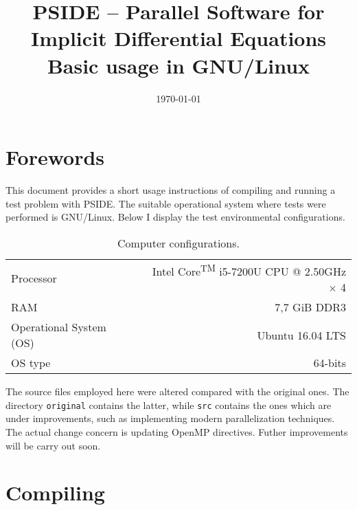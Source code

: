 \documentclass[a4paper,11pt]{article}
\title{{\LARGE \textbf{PSIDE -- Parallel Software for Implicit Differential Equations}}\\ 
{Basic usage in GNU/Linux}
 }%
\date{\today}
\theoremstyle{comm}
\begin{document}
\maketitle


\section{Forewords}

This document provides a short usage instructions of compiling and running a test problem with PSIDE. The suitable operational system where tests were performed is GNU/Linux. Below I display the test environmental configurations.

\begin{table}[h]
\centering
{\fontsize{10}{12}\selectfont
\begin{tabular}{l | r} \toprule \toprule
Processor 	&  Intel\textsuperscript{\tiny{\textregistered}} Core\textsuperscript{\tiny{TM}} i5-7200U CPU @ 2.50GHz $\times$ 4  \\[0.3em] 
RAM &  7,7 GiB DDR3 \\[0.3em] 
Operational System (OS) &  Ubuntu 16.04 LTS \\[0.3em]
OS type &  64-bits \\
\bottomrule \bottomrule
\end{tabular}}
\caption{Computer configurations.}\label{pcconfig}
\end{table}

The source files employed here were altered compared with the original ones. The directory \texttt{original} contains the latter, while \texttt{src} contains the ones which are under improvements, such as implementing modern parallelization techniques. The actual change concern is updating OpenMP directives. Futher improvements will be carry out soon.

\section{Compiling}
\end{document}
